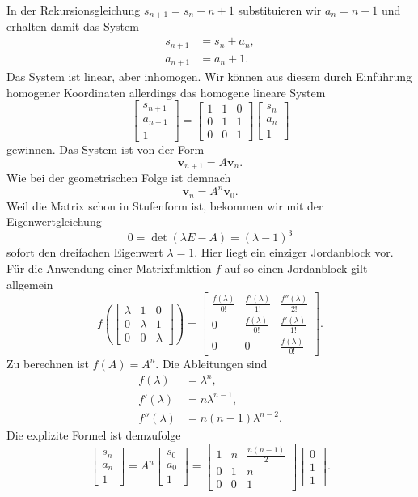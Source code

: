 \documentclass[a4paper,10pt,fleqn,twocolumn,twoside]{scrartcl}
\newcommand{\bvec}[1]{\mathbf{#1}}
\begin{document}
In der Rekursionsgleichung $s_{n+1} = s_n+n+1$ substituieren wir
$a_n = n+1$ und erhalten damit das System
\begin{align*}
s_{n+1} &= s_n + a_n,\\
a_{n+1} &= a_n + 1.
\end{align*}
Das System ist linear, aber inhomogen. Wir können aus diesem durch
Einführung homogener Koordinaten allerdings das homogene
lineare System
\[\begin{bmatrix}
s_{n+1}\\ a_{n+1}\\ 1
\end{bmatrix} = \begin{bmatrix}
1 & 1 & 0\\
0 & 1 & 1\\
0 & 0 & 1
\end{bmatrix}
\begin{bmatrix}
s_n\\ a_n\\ 1
\end{bmatrix}\]
gewinnen. Das System ist von der Form
\[\bvec v_{n+1} = A\bvec v_{n}.\]
Wie bei der geometrischen Folge ist demnach
\[\bvec v_n = A^n\bvec v_0.\]
Weil die Matrix schon in Stufenform ist, bekommen wir mit der
Eigenwertgleichung
\[0 = \det(\lambda E-A) = (\lambda-1)^3\]
sofort den dreifachen Eigenwert $\lambda = 1$. Hier liegt ein
einziger Jordanblock vor. Für die Anwendung einer Matrixfunktion $f$
auf so einen Jordanblock gilt allgemein%
\[f(\begin{bmatrix}
\lambda & 1 & 0\\[2pt]
0 & \lambda & 1\\[2pt]
0 & 0 & \lambda
\end{bmatrix})
= \begin{bmatrix}
\frac{f(\lambda)}{0!} & \frac{f'(\lambda)}{1!} & \frac{f''(\lambda)}{2!}\\[2pt]
0 & \frac{f(\lambda)}{0!} & \frac{f'(\lambda)}{1!}\\[2pt]
0 & 0 & \frac{f(\lambda)}{0!}
\end{bmatrix}.\]
Zu berechnen ist $f(A)=A^n$. Die Ableitungen sind
\begin{align*}
f(\lambda) &= \lambda^n,\\
f'(\lambda) &= n\lambda^{n-1},\\
f''(\lambda) &= n(n-1)\lambda^{n-2}.
\end{align*}
Die explizite Formel ist demzufolge
\[\begin{bmatrix}
s_n\\ a_n\\ 1
\end{bmatrix} = A^n\begin{bmatrix}
s_0\\ a_0\\ 1
\end{bmatrix}
= \begin{bmatrix}
1 & n & \frac{n(n-1)}{2}\\
0 & 1 & n\\
0 & 0 & 1
\end{bmatrix}
\begin{bmatrix}
0\\ 1\\ 1
\end{bmatrix}.\]
\end{document}
